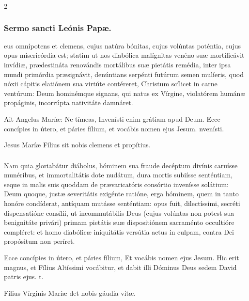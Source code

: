 \documentclass[9pt,twoside]{extarticle}
\begin{document}
\begin{multicols}{2}
\subsubsection*{\center Sermo sancti Leónis Papæ.}
\begin{center}\end{center}
eus omnípotens et clemens, cujus natúra bónitas, cujus volúntas poténtia, cujus opus misericórdia est; statim ut nos diabólica malígnitas venéno suæ mortificávit invídiæ, prædestináta renovándis mortálibus suæ pietátis remédia, inter ipsa mundi primórdia præsignávit, denúntians serpénti futúrum semen mulíeris, quod nóxii cápitis elatiónem sua virtúte contéreret, Christum scílicet in carne ventúrum: Deum hominémque signans, qui natus ex Vírgine, violatórem humánæ propáginis, incorrúpta nativitáte damnáret.

\begin{tightlist}{}
\item {} Ait Angelus Maríæ: Ne tímeas, \textred{*} Invenísti enim grátiam apud Deum.  Ecce concípies in útero, et páries fílium, et vocábis nomen ejus Jesum. nvenísti.
\item {\small {} Jesus Maríæ Fílius sit nobis clemens et propítius.}
\end{tightlist}

\subsubsection*{\center {}}
\lettrine{N}am quia gloriabátur diábolus, hóminem sua fraude decéptum divínis caruísse munéribus, et immortalitátis dote nudátum, dura mortis subiísse senténtiam, seque in malis suis quoddam de prævaricatóris consórtio invenísse solátium: Deum quoque, justæ severitátis exigénte ratióne, erga hóminem, quem in tanto honóre condíderat, antíquam mutásse senténtiam: opus fuit, dilectíssimi, secréti dispensatióne consílii, ut incommutábilis Deus (cujus volúntas non potest sua benignitáte privári) primam pietátis suæ dispositiónem sacraménto occultióre compléret: et homo diabólicæ iniquitátis versútia actus in culpam, contra Dei propósitum non períret.

\begin{tightlist}{}
\item {} Ecce concípies in útero, et páries fílium, \textred{*} Et vocábis nomen ejus Jesum.  Hic erit magnus, et Fílius Altíssimi vocábitur, et dabit illi Dóminus Deus sedem David patris ejus. t.
\item {\small {} Fílius Vírginis Maríæ det nobis gáudia vitæ.}
\end{tightlist}


\end{multicols}
\end{document}
